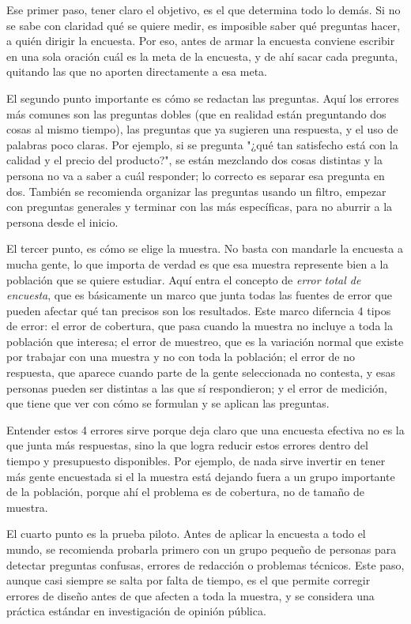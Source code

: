 \documentclass[12pt,letterpaper]{article}
\begin{document}
Ese primer paso, tener claro el objetivo, es el que determina todo lo demás. Si no se sabe con claridad qué se quiere medir, es imposible saber qué preguntas hacer, a quién dirigir la encuesta. Por eso, antes de armar la encuesta conviene escribir en una sola oración cuál es la meta de la encuesta, y de ahí sacar cada pregunta, quitando las que no aporten directamente a esa meta.

El segundo punto importante es cómo se redactan las preguntas. Aquí los errores más comunes son las preguntas dobles (que en realidad están preguntando dos cosas al mismo tiempo), las preguntas que ya sugieren una respuesta, y el uso de palabras poco claras. Por ejemplo, si se pregunta "¿qué tan satisfecho está con la calidad y el precio del producto?", se están mezclando dos cosas distintas y la persona no va a saber a cuál responder; lo correcto es separar esa pregunta en dos. También se recomienda organizar las preguntas usando un filtro, empezar con preguntas generales y terminar con las más específicas, para no aburrir a la persona desde el inicio.

El tercer punto, es cómo se elige la muestra. No basta con mandarle la encuesta a mucha gente, lo que importa de verdad es que esa muestra represente bien a la población que se quiere estudiar. Aquí entra el concepto de \textit{error total de encuesta}, que es básicamente un marco que junta todas las fuentes de error que pueden afectar qué tan precisos son los resultados. Este marco diferncia 4 tipos de error: el error de cobertura, que pasa cuando la muestra no incluye a toda la población que interesa; el error de muestreo, que es la variación normal que existe por trabajar con una muestra y no con toda la población; el error de no respuesta, que aparece cuando parte de la gente seleccionada no contesta, y esas personas pueden ser distintas a las que sí respondieron; y el error de medición, que tiene que ver con cómo se formulan y se aplican las preguntas.

Entender estos 4 errores sirve porque deja claro que una encuesta efectiva no es la que junta más respuestas, sino la que logra reducir estos errores dentro del tiempo y presupuesto disponibles. Por ejemplo, de nada sirve invertir en tener más gente encuestada si el la muestra está dejando fuera a un grupo importante de la población, porque ahí el problema es de cobertura, no de tamaño de muestra.

El cuarto punto es la prueba piloto. Antes de aplicar la encuesta a todo el mundo, se recomienda probarla primero con un grupo pequeño de personas para detectar preguntas confusas, errores de redacción o problemas técnicos. Este paso, aunque casi siempre se salta por falta de tiempo, es el que permite corregir errores de diseño antes de que afecten a toda la muestra, y se considera una práctica estándar en investigación de opinión pública.
\end{document}
